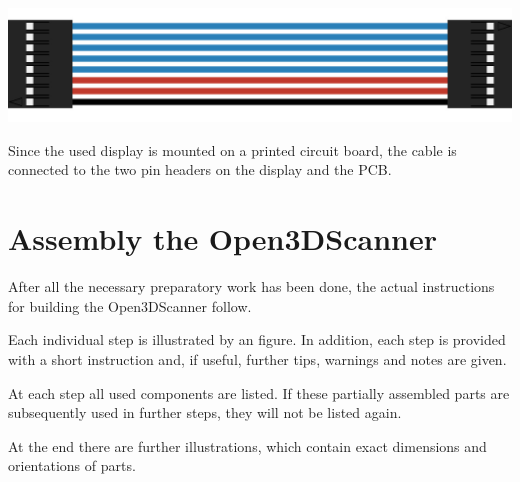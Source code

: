 \includegraphics[width=\linewidth]{images/DisplayCable.jpg}%
{}%

Since the used display is mounted on a printed circuit board, the cable is connected to the two pin headers on the display and the PCB.

\section{Assembly the Open3DScanner}%
\label{sec:assembly}
After all the necessary preparatory work has been done, the actual instructions for building the Open3DScanner follow.%

Each individual step is illustrated by an figure. In addition, each step is provided with a short instruction and, if useful, further tips, warnings and notes are given.%

At each step all used components are listed. If these partially assembled parts are subsequently used in further steps, they will not be listed again.%

At the end there are further illustrations, which contain exact dimensions and orientations of parts.%
\clearpage%

%

%

%

